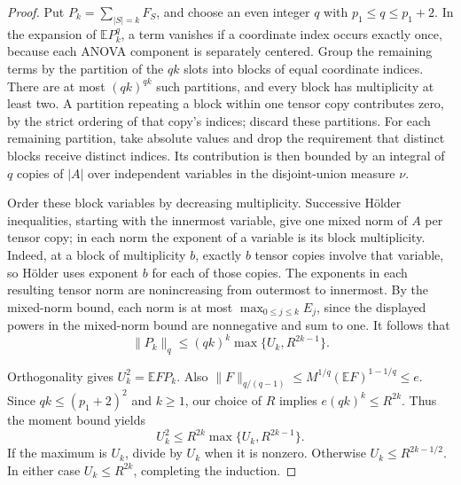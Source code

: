 \begin{proof}
Put $P_k=\sum_{|S|=k}F_S$, and choose an even integer $q$ with
$p_1\le q\le p_1+2$. In the expansion of $\mathbb E P_k^q$, a term
vanishes if a coordinate index occurs exactly once, because each ANOVA
component is separately centered. Group the remaining terms by the
partition of the $qk$ slots into blocks of equal coordinate indices.
There are at most $(qk)^{qk}$ such partitions, and every block has
multiplicity at least two. A partition repeating a block within one tensor
copy contributes zero, by the strict ordering of that copy's indices;
discard these partitions. For each remaining partition, take absolute values and
drop the requirement that distinct blocks receive distinct indices.
Its contribution is then bounded by an integral of $q$ copies of $|A|$
over independent variables in the disjoint-union measure $\nu$.

Order these block variables by decreasing multiplicity. Successive
H\"older inequalities, starting with the innermost variable, give one
mixed norm of $A$ per tensor copy; in each norm the exponent of a variable
is its block multiplicity. Indeed, at a block of multiplicity $b$, exactly
$b$ tensor copies involve that variable, so H\"older uses exponent $b$
for each of those copies. The exponents in each resulting tensor norm
are nonincreasing from outermost to innermost. By the mixed-norm bound, each norm is at
most $\max_{0\le j\le k}E_j$, since the displayed powers in the mixed-norm bound are
nonnegative and sum to one. It follows that
\[
 \|P_k\|_q\le(qk)^k\max\{U_k,R^{2k-1}\}.
\]

Orthogonality gives $U_k^2=\mathbb E FP_k$. Also
$\|F\|_{q/(q-1)}\le M^{1/q}(\mathbb EF)^{1-1/q}\le e$.
Since $qk\le(p_1+2)^2$ and $k\ge1$, our choice of $R$ implies
$e(qk)^k\le R^{2k}$. Thus the moment bound yields
\[
 U_k^2\le R^{2k}\max\{U_k,R^{2k-1}\}.
\]
If the maximum is $U_k$, divide by $U_k$ when it is nonzero. Otherwise
$U_k\le R^{2k-1/2}$. In either case $U_k\le R^{2k}$, completing the
induction.
\end{proof}


